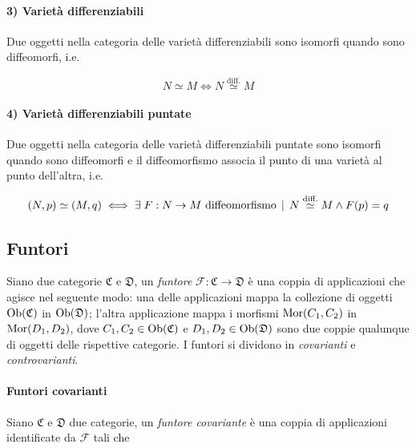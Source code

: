 \paragraph{3) Varietà differenziabili}

Due oggetti nella categoria delle varietà differenziabili sono isomorfi quando sono diffeomorfi, i.e.

\begin{equation}
	N \simeq M \iff N \stackrel{\text{diff.}}{\simeq} M
\end{equation}

\paragraph{4) Varietà differenziabili puntate}

Due oggetti nella categoria delle varietà differenziabili puntate sono isomorfi quando sono diffeomorfi e il diffeomorfismo associa il punto di una varietà al punto dell'altra, i.e.

\begin{equation}
	(N,p) \simeq (M,q) \iff \exists \; F : N \to M \text{ diffeomorfismo} \, \mid \, N \stackrel{\text{diff.}}{\simeq} M \wedge F(p)=q
\end{equation}

\subsection{Funtori}

Siano due categorie $ \mathfrak{C} $ e $ \mathfrak{D} $, un \textit{funtore} $ \mathcal{F} : \mathfrak{C} \to \mathfrak{D} $ è una coppia di applicazioni che agisce nel seguente modo: una delle applicazioni mappa la collezione di oggetti $ \operatorname{Ob}(\mathfrak{C}) $ in $ \operatorname{Ob}(\mathfrak{D}) $; l'altra applicazione mappa i morfismi $ \operatorname{Mor}(C_{1}, C_{2}) $ in $ \operatorname{Mor}(D_{1} ,D_{2}) $, dove $ C_{1}, C_{2} \in \operatorname{Ob}(\mathfrak{C}) $ e $ D_{1}, D_{2} \in \operatorname{Ob}(\mathfrak{D}) $ sono due coppie qualunque di oggetti delle rispettive categorie. I funtori si dividono in \textit{covarianti} e \textit{controvarianti}.

\paragraph{Funtori covarianti}

Siano $ \mathfrak{C} $ e $ \mathfrak{D} $ due categorie, un \textit{funtore covariante} è una coppia di applicazioni identificate da $ \mathcal{F} $ tali che

